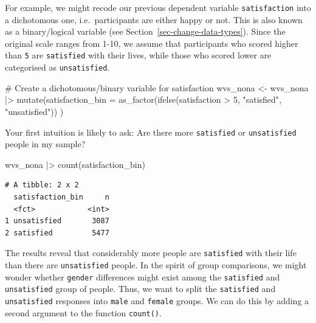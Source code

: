 \documentclass[
  letterpaper,
  DIV=11,
  numbers=noendperiod]{scrreprt}
\newenvironment{Shaded}{\begin{snugshade}}{\end{snugshade}}
\newcommand{\AttributeTok}[1]{\textcolor[rgb]{0.40,0.45,0.13}{#1}}
\newcommand{\CommentTok}[1]{\textcolor[rgb]{0.37,0.37,0.37}{#1}}
\newcommand{\DecValTok}[1]{\textcolor[rgb]{0.68,0.00,0.00}{#1}}
\newcommand{\FunctionTok}[1]{\textcolor[rgb]{0.28,0.35,0.67}{#1}}
\newcommand{\NormalTok}[1]{\textcolor[rgb]{0.00,0.23,0.31}{#1}}
\newcommand{\OtherTok}[1]{\textcolor[rgb]{0.00,0.23,0.31}{#1}}
\newcommand{\SpecialCharTok}[1]{\textcolor[rgb]{0.37,0.37,0.37}{#1}}
\newcommand{\StringTok}[1]{\textcolor[rgb]{0.13,0.47,0.30}{#1}}
\begin{document}
For example, we might recode our previous dependent variable
\texttt{satisfaction} into a dichotomous one, i.e.~participants are
either happy or not. This is also known as a binary/logical variable
(see Section~\ref{sec-change-data-types}). Since the original scale
ranges from 1-10, we assume that participants who scored higher than
\texttt{5} are \texttt{satisfied} with their lives, while those who
scored lower are categorised as \texttt{unsatisfied}.

\begin{Shaded}
\begin{Highlighting}[]
\CommentTok{\# Create a dichotomous/binary variable for satisfaction}
\NormalTok{wvs\_nona }\OtherTok{\textless{}{-}}
\NormalTok{  wvs\_nona }\SpecialCharTok{|\textgreater{}}
  \FunctionTok{mutate}\NormalTok{(}\AttributeTok{satisfaction\_bin =} \FunctionTok{as\_factor}\NormalTok{(}\FunctionTok{ifelse}\NormalTok{(satisfaction }\SpecialCharTok{\textgreater{}} \DecValTok{5}\NormalTok{,}
                                             \StringTok{"satisfied"}\NormalTok{,}
                                             \StringTok{"unsatisfied"}\NormalTok{))}
\NormalTok{         )}
\end{Highlighting}
\end{Shaded}

Your first intuition is likely to ask: Are there more \texttt{satisfied}
or \texttt{unsatisfied} people in my sample?

\begin{Shaded}
\begin{Highlighting}[]
\NormalTok{wvs\_nona }\SpecialCharTok{|\textgreater{}} \FunctionTok{count}\NormalTok{(satisfaction\_bin)}
\end{Highlighting}
\end{Shaded}

\begin{verbatim}
# A tibble: 2 x 2
  satisfaction_bin     n
  <fct>            <int>
1 unsatisfied       3087
2 satisfied         5477
\end{verbatim}

The results reveal that considerably more people are \texttt{satisfied}
with their life than there are \texttt{unsatisfied} people. In the
spirit of group comparisons, we might wonder whether \texttt{gender}
differences might exist among the \texttt{satisfied} and
\texttt{unsatisfied} group of people. Thus, we want to split the
\texttt{satisfied} and \texttt{unsatisfied} responses into \texttt{male}
and \texttt{female} groups. We can do this by adding a second argument
to the function \texttt{count()}.
\end{document}
